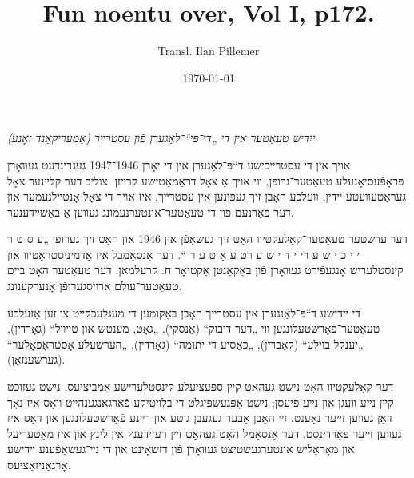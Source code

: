\documentclass{article}
\begin{document}
\renewcommand{\abstractname}{\vspace{-\baselineskip}}
\title{Fun noentu over, Vol I, p172.}
\author{Transl. Ilan Pillemer}
\date{\today}

\maketitle



\begin{pairs}

\begin{Rightside}

\begin{RTL}
\begin{hebrew}
\beginnumbering
\autopar
\emph{
ייִדיש טעאַטער אין די „די־פּי“־לאַגערן פֿון עסטרײך (אַמעריקאַנד זאָנע)
}
\newline

אויך אין די עסטרײכישע ד“פּ־לאַגערן אין די יאָרן 1946־1947
געגרינדעט געװאָרן פּראָפֿעסיאָנעלע טעאַטער־גרופּן, װי אויך אַ צאָל דראַמאַטישע קרײזן.
 צוליב דער קלײנער צאָל געראַטעװעטע ײדין, װעלכע האָבן זיך געפֿונען אין עסטרײך, איז אויך די צאָל אָנטײלנעמער און
 דער פֿאַרנעם פֿון די טעאַטער־אונטערנעמונג געװען אַ באַשײדענער.

דער ערשטער טעאַטער־קאָלעקטיװ האָט זיך געשאַפֿן אין 1946 און האָט זיך גערופן „ע ס ט ר י י כ י ש ע ר\space\space  י י ד י ש ע ר\space\space  ט ע אַ ט ע ר “.
דער אַנסאַמבל איז אַדמיניסטראַטיװ און קינסטלעריש אָנגעפֿירט געװאָרן פֿון באַקאַנטן אַקטיאָר ח. קרעלמאן. 
דער טעאַטער האָט בײם טעאַטער־עולם ארויסגערופֿן אָנערקענונג.

די ײדישע ד“פּ־לאַנגערן אין עסטרײך האָבן באַקומען די מעגלעכקײט צו זען אַזעלכע טעאַטער־פֿאָרשטעלונגען װי „דער דיבוק“ (אַנסקי),
„גאָט, מענטש און טײװל“ (גאָרדין), „יענקל בוילע“ (קאָברין), „כאַסיע די יתומה“ (גאָרדין),
„הערשעלע אָסטראָפּאָלער“ (גערשענזאָן).

דער קאָלעקטיװ האָט נישט געהאַט קײן ספּעציעלע קינסטלערישע אַמביציעס, נישט געזוכט קײן נײע װעגן און נײע פּיעסן;
נישט אָפּגעשפּיגלט די בלויטיקע פֿאַרגאַנגענהײט װאָס איז נאָך דאַן געװען זײער נאָענט.
זײ האָבן אָבער געגעבן גוטע און רײנע פֿאָרשטעלונגען און דאָס איז געװען זײער פּאַרדינסט.
דער אַנסאַמל האָט געהאַט זײן רעזידענץ אין לינץ און איז מאַטעריעל
און מאָראַליש אונטערגעשטיצט געװאָרן פֿון דזשאָינט און די
נײ־געשאַפֿענע ײדישע אָרגאַניזאַציעס.

\endnumbering
\end{hebrew}
\end{RTL}
\end{Rightside}



\end{pairs}
\end{document}
